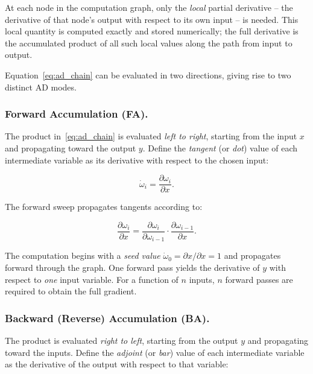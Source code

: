 \documentclass[12pt, a4paper]{article}
\begin{document}
At each node in the computation graph, only the \emph{local} partial
derivative -- the derivative of that node's output with respect to its own
input -- is needed.
This local quantity is computed exactly and stored numerically; the full
derivative is the accumulated product of all such local values along the
path from input to output.


Equation~\eqref{eq:ad_chain} can be evaluated in two directions, giving rise
to two distinct AD modes.

\subsubsection{Forward Accumulation (FA).}
The product in~\eqref{eq:ad_chain} is evaluated \emph{left to right},
starting from the input $x$ and propagating toward the output $y$.
Define the \emph{tangent} (or \emph{dot}) value of each intermediate variable
as its derivative with respect to the chosen input:

\begin{equation}
  \dot{\omega}_i = \frac{\partial \omega_i}{\partial x}.
\end{equation}

The forward sweep propagates tangents according to:

\begin{equation}
  \frac{\partial \omega_i}{\partial x}
  = \frac{\partial \omega_i}{\partial \omega_{i-1}}
    \cdot \frac{\partial \omega_{i-1}}{\partial x}.
  \label{eq:FA}
\end{equation}

The computation begins with a \emph{seed value} $\dot{\omega}_0 = \partial x / \partial x = 1$
and propagates forward through the graph.
One forward pass yields the derivative of $y$ with respect to \emph{one}
input variable.
For a function of $n$ inputs, $n$ forward passes are required to obtain the
full gradient.

\subsubsection{Backward (Reverse) Accumulation (BA).}
The product is evaluated \emph{right to left}, starting from the output $y$
and propagating toward the inputs.
Define the \emph{adjoint} (or \emph{bar}) value of each intermediate variable
as the derivative of the output with respect to that variable:
\end{document}
